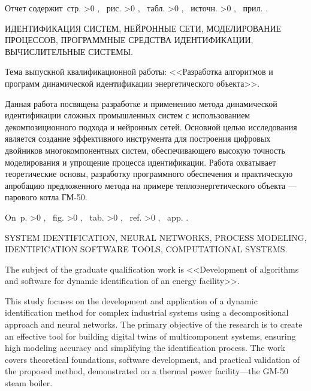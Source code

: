 \begin{Referat}

    Отчет содержит \pageref{LastPage}\,стр.%
    \ifnum \totfig >0 , \totfig~рис.%
    \fi
    \ifnum \tottab >0 , \tottab~табл.%
    \fi
    \ifnum \totbib >0 , \totbib~источн.%
    \fi
    \ifnum \totapp >0 , \totapp~прил.%
    \else
    .%
    \fi

    ИДЕНТИФИКАЦИЯ СИСТЕМ, НЕЙРОННЫЕ СЕТИ, МОДЕЛИРОВАНИЕ ПРОЦЕССОВ, ПРОГРАММНЫЕ
    СРЕДСТВА ИДЕНТИФИКАЦИИ, ВЫЧИСЛИТЕЛЬНЫЕ СИСТЕМЫ.

    Тема выпускной квалификационной работы: <<Разработка алгоритмов и программ
    динамической идентификации энергетического объекта>>.

    Данная работа посвящена разработке и применению метода динамической
    идентификации сложных промышленных систем с использованием декомпозиционного
    подхода и нейронных сетей. Основной целью исследования является создание
    эффективного инструмента для построения цифровых двойников многокомпонентных
    систем, обеспечивающего высокую точность моделирования и упрощение процесса
    идентификации. Работа охватывает теоретические основы, разработку
    программного обеспечения и практическую апробацию предложенного метода на
    примере теплоэнергетического объекта — парового котла ГМ-50. 
    \nocite{*}

\end{Referat}



\begin{ReferatEng}

    On \pageref{LastPage}\,p.%
    \ifnum \totfig >0 , \totfig~fig.%
    \fi
    \ifnum \tottab >0 , \tottab~tab.%
    \fi
    \ifnum \totbib >0 , \totbib~ref.%
    \fi
    \ifnum \totapp >0 , \totapp~app.%
    \else
    .%
    \fi

    SYSTEM IDENTIFICATION, NEURAL NETWORKS, PROCESS MODELING, IDENTIFICATION
    SOFTWARE TOOLS, COMPUTATIONAL SYSTEMS.

    The subject of the graduate qualification work is <<Development of
    algorithms and software for dynamic identification of an energy facility>>.

    This study focuses on the development and application of a dynamic
    identification method for complex industrial systems using a decompositional
    approach and neural networks. The primary objective of the research is to
    create an effective tool for building digital twins of multicomponent
    systems, ensuring high modeling accuracy and simplifying the identification
    process. The work covers theoretical foundations, software development, and
    practical validation of the proposed method, demonstrated on a thermal power
    facility—the GM-50 steam boiler.

\end{ReferatEng}